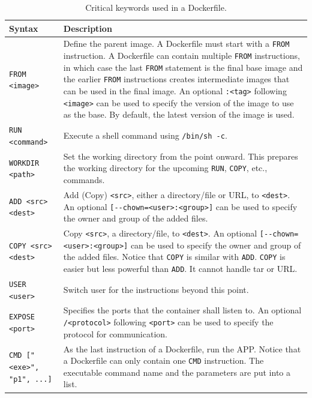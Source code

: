\begin{table}
	\centering \caption{Critical keywords used in a Dockerfile.}\label{ch:vac:tab:keywordsdockerfile}
	\begin{tabularx}{\textwidth}{lX}
		\hline
		Syntax & Description \\ \hline
		\verb|FROM <image>| & Define the parent image. A Dockerfile must start with a \verb|FROM| instruction. A Dockerfile can contain multiple \verb|FROM| instructions, in which case the last \verb|FROM| statement is the final base image and the earlier \verb|FROM| instructions creates intermediate images that can be used in the final image. An optional \verb|:<tag>| following \verb|<image>| can be used to specify the version of the image to use as the base. By default, the latest version of the image is used. \\ \hdashline
		\verb|RUN <command>| & Execute a shell command using \verb|/bin/sh -c|. \\ \hdashline
		\verb|WORKDIR <path>| & Set the working directory from the point onward. This prepares the working directory for the upcoming \verb|RUN|, \verb|COPY|, etc., commands. \\ \hdashline
		\verb|ADD <src> <dest>| & Add (Copy) \verb|<src>|, either a directory/file or URL, to \verb|<dest>|. An optional \verb|[--chown=<user>:<group>]| can be used to specify the owner and group of the added files. \\ \hdashline
		\verb|COPY <src> <dest>| & Copy \verb|<src>|, a directory/file, to \verb|<dest>|. An optional \verb|[--chown=<user>:<group>]| can be used to specify the owner and group of the added files. Notice that \verb|COPY| is similar with \verb|ADD|. \verb|COPY| is easier but less powerful than \verb|ADD|. It cannot handle tar or URL. \\ \hdashline
		\verb|USER <user>| & Switch user for the instructions beyond this point. \\ \hdashline
		\verb|EXPOSE <port>| & Specifies the ports that the container shall listen to. An optional \verb|/<protocol>| following \verb|<port>| can be used to specify the protocol for communication. \\ \hdashline
		\verb|CMD ["<exe>", "p1", ...]| & As the last instruction of a Dockerfile, run the APP. Notice that a Dockerfile can only contain one \verb|CMD| instruction. The executable command name and the parameters are put into a list. \\
		\hline
	\end{tabularx}
\end{table}

